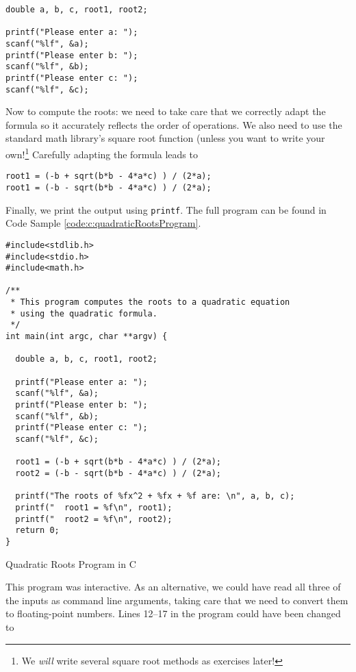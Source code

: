 \begin{verbatim}
double a, b, c, root1, root2;

printf("Please enter a: ");
scanf("%lf", &a);
printf("Please enter b: ");
scanf("%lf", &b);
printf("Please enter c: ");
scanf("%lf", &c);
\end{verbatim}

Now to compute the roots: we need to take care that we correctly adapt the
formula so it accurately reflects the order of operations.  We also need to use
the standard math library's square root function (unless you want to write 
your own!\footnote{We \emph{will} write several square root methods as
exercises later!}  Carefully adapting the formula leads to 

\begin{verbatim}
root1 = (-b + sqrt(b*b - 4*a*c) ) / (2*a);
root1 = (-b - sqrt(b*b - 4*a*c) ) / (2*a);
\end{verbatim}

Finally, we print the output using \texttt{printf}.  The full program 
can be found in Code Sample \ref{code:c:quadraticRootsProgram}.

\begin{listing}[h]
\begin{verbatim}
#include<stdlib.h>
#include<stdio.h>
#include<math.h>

/**
 * This program computes the roots to a quadratic equation
 * using the quadratic formula.
 */
int main(int argc, char **argv) {

  double a, b, c, root1, root2;

  printf("Please enter a: ");
  scanf("%lf", &a);
  printf("Please enter b: ");
  scanf("%lf", &b);
  printf("Please enter c: ");
  scanf("%lf", &c);
  
  root1 = (-b + sqrt(b*b - 4*a*c) ) / (2*a);
  root2 = (-b - sqrt(b*b - 4*a*c) ) / (2*a);
  
  printf("The roots of %fx^2 + %fx + %f are: \n", a, b, c);
  printf("  root1 = %f\n", root1);
  printf("  root2 = %f\n", root2);
  return 0;
}
\end{verbatim}
\caption{Quadratic Roots Program in C}
\label{code:c:quadraticRootsProgram}
\end{listing}

This program was interactive.  As an alternative, we could have read 
all three of the inputs as command line arguments, taking care that we
need to convert them to floating-point numbers.  Lines 12--17 in the
program could have been changed to 

